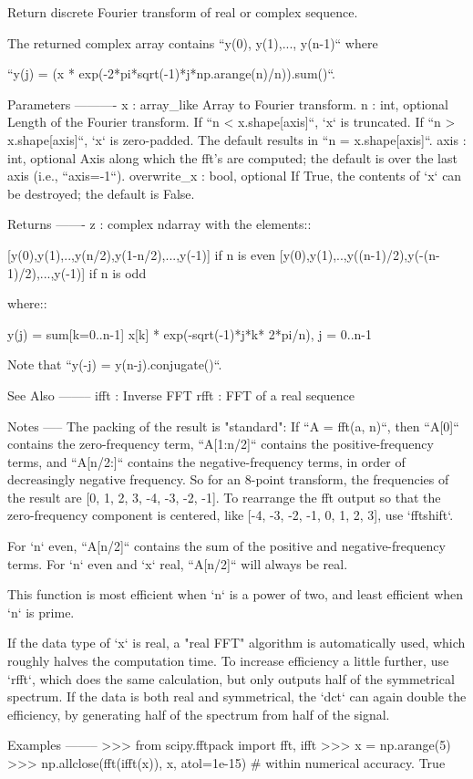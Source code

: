 \begin{DoxyVerb}Return discrete Fourier transform of real or complex sequence.

The returned complex array contains ``y(0), y(1),..., y(n-1)`` where

``y(j) = (x * exp(-2*pi*sqrt(-1)*j*np.arange(n)/n)).sum()``.

Parameters
----------
x : array_like
    Array to Fourier transform.
n : int, optional
    Length of the Fourier transform.  If ``n < x.shape[axis]``, `x` is
    truncated.  If ``n > x.shape[axis]``, `x` is zero-padded. The
    default results in ``n = x.shape[axis]``.
axis : int, optional
    Axis along which the fft's are computed; the default is over the
    last axis (i.e., ``axis=-1``).
overwrite_x : bool, optional
    If True, the contents of `x` can be destroyed; the default is False.

Returns
-------
z : complex ndarray
    with the elements::

        [y(0),y(1),..,y(n/2),y(1-n/2),...,y(-1)]        if n is even
        [y(0),y(1),..,y((n-1)/2),y(-(n-1)/2),...,y(-1)]  if n is odd

    where::

        y(j) = sum[k=0..n-1] x[k] * exp(-sqrt(-1)*j*k* 2*pi/n), j = 0..n-1

    Note that ``y(-j) = y(n-j).conjugate()``.

See Also
--------
ifft : Inverse FFT
rfft : FFT of a real sequence

Notes
-----
The packing of the result is "standard": If ``A = fft(a, n)``, then
``A[0]`` contains the zero-frequency term, ``A[1:n/2]`` contains the
positive-frequency terms, and ``A[n/2:]`` contains the negative-frequency
terms, in order of decreasingly negative frequency. So for an 8-point
transform, the frequencies of the result are [0, 1, 2, 3, -4, -3, -2, -1].
To rearrange the fft output so that the zero-frequency component is
centered, like [-4, -3, -2, -1,  0,  1,  2,  3], use `fftshift`.

For `n` even, ``A[n/2]`` contains the sum of the positive and
negative-frequency terms.  For `n` even and `x` real, ``A[n/2]`` will
always be real.

This function is most efficient when `n` is a power of two, and least
efficient when `n` is prime.

If the data type of `x` is real, a "real FFT" algorithm is automatically
used, which roughly halves the computation time.  To increase efficiency
a little further, use `rfft`, which does the same calculation, but only
outputs half of the symmetrical spectrum.  If the data is both real and
symmetrical, the `dct` can again double the efficiency, by generating
half of the spectrum from half of the signal.

Examples
--------
>>> from scipy.fftpack import fft, ifft
>>> x = np.arange(5)
>>> np.allclose(fft(ifft(x)), x, atol=1e-15)  # within numerical accuracy.
True\end{DoxyVerb}
 \hypertarget{namespacescipy_1_1fftpack_1_1basic_a32222d4394999076d2af80514b0c7579}{}
